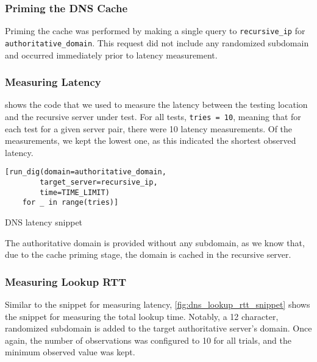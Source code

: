 \subsubsection{Priming the DNS Cache}

Priming the \dns cache was performed by making a single \dns query to \texttt{recursive\_ip} for \texttt{authoritative\_domain}. This request did not include any randomized subdomain and occurred immediately prior to latency measurement.

\subsubsection{Measuring Latency}

 shows the code that we used to measure the latency between the testing location and the recursive \dns server under test. For all tests, \texttt{tries = 10}, meaning that for each test for a given server pair, there were 10 latency measurements. Of the measurements, we kept the lowest one, as this indicated the shortest observed latency.

\begin{code}[h]
\centering
\begin{minipage}{0.66\textwidth}
    \begin{verbatim}
[run_dig(domain=authoritative_domain, 
        target_server=recursive_ip, 
        time=TIME_LIMIT) 
    for _ in range(tries)]
    \end{verbatim}
\end{minipage}
    \caption{DNS latency snippet}
    \label{fig:dns_latency_snippet}
\end{code}

The authoritative domain is provided without any subdomain, as we know that, due to the cache priming stage, the domain is cached in the recursive server.

\subsubsection{Measuring Lookup RTT}

Similar to the snippet for measuring latency, \cref{fig:dns_lookup_rtt_snippet} shows the snippet for measuring the total lookup time. Notably, a 12 character, randomized subdomain is added to the target authoritative server's domain. Once again, the number of observations was configured to 10 for all trials, and the minimum observed value was kept.

